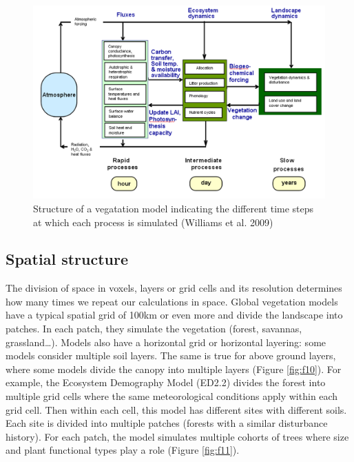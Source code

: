 \documentclass[
  12pt,
  oneside]{book}
\begin{document}
\begin{figure}

{\centering \includegraphics[width=0.8\linewidth]{figures/chap1/time_steps} 

}

\caption{Structure of a vegatation model indicating the different time steps at which each process is simulated (Williams et al. 2009)}\label{fig:f9}
\end{figure}

\hypertarget{spatial-structure}{%
\subsection{Spatial structure}\label{spatial-structure}}

The division of space in voxels, layers or grid cells and its resolution determines how many times we repeat our calculations in space. Global vegetation models have a typical spatial grid of 100km or even more and divide the landscape into patches. In each patch, they simulate the vegetation (forest, savannas, grassland\ldots). Models also have a horizontal grid or horizontal layering: some models consider multiple soil layers. The same is true for above ground layers, where some models divide the canopy into multiple layers (Figure \ref{fig:f10}).
For example, the Ecosystem Demography Model (ED2.2) divides the forest into multiple grid cells where the same meteorological conditions apply within each grid cell. Then within each cell, this model has different sites with different soils. Each site is divided into multiple patches (forests with a similar disturbance history). For each patch, the model simulates multiple cohorts of trees where size and plant functional types play a role (Figure \ref{fig:f11}).
\end{document}
